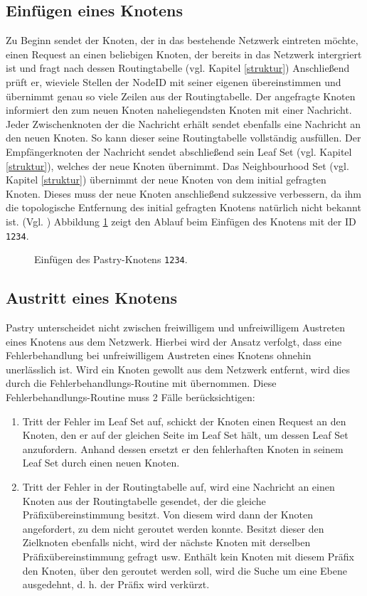 \subsection{Einfügen eines Knotens}
Zu Beginn sendet der Knoten, der in das bestehende Netzwerk eintreten möchte,
einen Request an einen beliebigen Knoten, der bereits in das Netzwerk
intergriert ist und fragt nach dessen Routingtabelle (vgl. Kapitel \ref{struktur})
Anschließend prüft er, wieviele Stellen der NodeID mit seiner eigenen
übereinstimmen und übernimmt genau so viele Zeilen aus der Routingtabelle.
Der angefragte Knoten informiert den zum neuen Knoten naheliegendsten Knoten
mit einer Nachricht. Jeder Zwischenknoten der die Nachricht
erhält sendet ebenfalls eine Nachricht an den neuen Knoten. So kann dieser seine
Routingtabelle vollständig ausfüllen. Der Empfängerknoten der Nachricht sendet
abschließend sein Leaf Set (vgl. Kapitel \ref{struktur}), welches der
neue Knoten übernimmt. 
Das Neighbourhood Set (vgl. Kapitel \ref{struktur}) übernimmt der neue
Knoten von dem initial gefragten Knoten. Dieses muss der neue Knoten
anschließend sukzessive verbessern, da ihm die topologische Entfernung des
initial gefragten Knotens natürlich nicht bekannt ist. (Vgl. \cite{Pastry})
Abbildung \ref{fig:pastry-insert-node} zeigt den Ablauf beim Einfügen des
Knotens mit der ID \texttt{1234}.

\begin{figure}[H]
  \centering 
  \def\JPicScale{0.70}
  
  \caption[Pastry: Knoten einfügen]{Einfügen des Pastry-Knotens \texttt{1234}.}
  \label{fig:pastry-insert-node}
\end{figure}

\subsection{Austritt eines Knotens}
Pastry unterscheidet nicht zwischen freiwilligem und unfreiwilligem Austreten 
eines Knotens aus dem Netzwerk. Hierbei wird der Ansatz verfolgt, dass eine
Fehlerbehandlung bei unfreiwilligem Austreten eines Knotens ohnehin unerlässlich
ist. Wird ein Knoten gewollt aus dem Netzwerk entfernt, wird dies durch die
Fehlerbehandlungs-Routine mit übernommen. Diese Fehlerbehandlungs-Routine
muss 2 Fälle berücksichtigen:
\begin{enumerate}
  \item Tritt der Fehler im Leaf Set auf, schickt der Knoten einen Request an
  den Knoten, den er auf der gleichen Seite im Leaf Set hält, um dessen Leaf Set
  anzufordern. Anhand dessen ersetzt er den fehlerhaften Knoten in seinem Leaf
  Set durch einen neuen Knoten.
  \item Tritt der Fehler in der Routingtabelle auf, wird eine Nachricht an einen
  Knoten aus der Routingtabelle gesendet, der die gleiche Präfixübereinstimmung
  besitzt. Von diesem wird dann der Knoten angefordert, zu dem nicht geroutet
  werden konnte. Besitzt dieser den Zielknoten ebenfalls nicht, wird der nächste
  Knoten mit derselben Präfixübereinstimmung gefragt usw. Enthält kein Knoten
  mit diesem Präfix den Knoten, über den geroutet werden soll, wird die Suche
  um eine Ebene ausgedehnt, d. h. der Präfix wird verkürzt.  
\end{enumerate}
